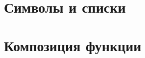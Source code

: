 \section{Символы и списки}\label{common-lisp:baseconstructions:symbols}
\section{Композиция функции}\label{common-lisp:baseconstructions:composition}
